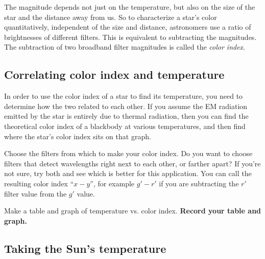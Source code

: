 The magnitude depends not just on the temperature, but also on the size of the star and the distance away from us. So to characterize a star's color quantitatively, independent of the size and distance, astronomers use a ratio of brightnesses of different filters. This is equivalent to subtracting the magnitudes. The subtraction of two broadband filter magnitudes is called the \textit{color index}.

\subsection{Correlating color index and temperature}

In order to use the color index of a star to find its temperature, you need to determine how the two related to each other. If you assume the EM radiation emitted by the star is entirely due to thermal radiation, then you can find the theoretical color index of a blackbody at various temperatures, and then find where the star's color index sits on that graph.

\begin{steps}
	\item Choose the filters from which to make your color index. Do you want to choose filters that detect wavelengths right next to each other, or farther apart? If you're not sure, try both and see which is better for this application. You can call the resulting color index ``$x - y$'', for example $g' - r'$ if you are subtracting the $r'$ filter value from the $g'$ value.
	
	\item\label{ic:step:tempcolor} Make a table and graph of temperature vs. color index. \textbf{Record your table and graph.}
\end{steps}

\subsection{Taking the Sun's temperature}

